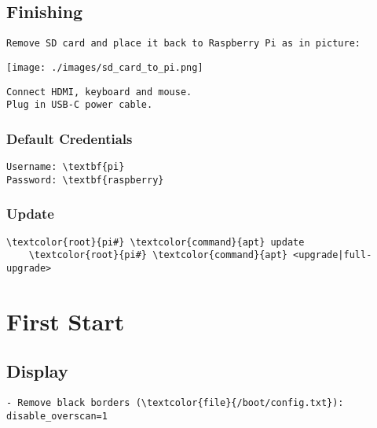 \documentclass[10pt, a4paper, onecolumn, openany]{book} %
\begin{document}
\section{Finishing}
\begin{Verbatim}[commandchars=\\\{\}]
Remove SD card and place it back to Raspberry Pi as in picture:
\end{Verbatim}
\begin{center}
    \texttt{[image: ./images/sd\_card\_to\_pi.png]}
\end{center}
\begin{Verbatim}[commandchars=\\\{\}]
Connect HDMI, keyboard and mouse.
Plug in USB-C power cable.
\end{Verbatim}

\subsection{Default Credentials}
\begin{Verbatim}[commandchars=\\\{\}]
Username: \textbf{pi}
Password: \textbf{raspberry}
\end{Verbatim}

\subsection{Update}
\begin{Verbatim}[commandchars=\\\{\}]
    \textcolor{root}{pi#} \textcolor{command}{apt} update
    \textcolor{root}{pi#} \textcolor{command}{apt} <upgrade|full-upgrade>
\end{Verbatim}


\chapter{First Start}
\section{Display}
\begin{Verbatim}[commandchars=\\\{\}]
- Remove black borders (\textcolor{file}{/boot/config.txt}):
disable_overscan=1
\end{Verbatim}
\end{document}
